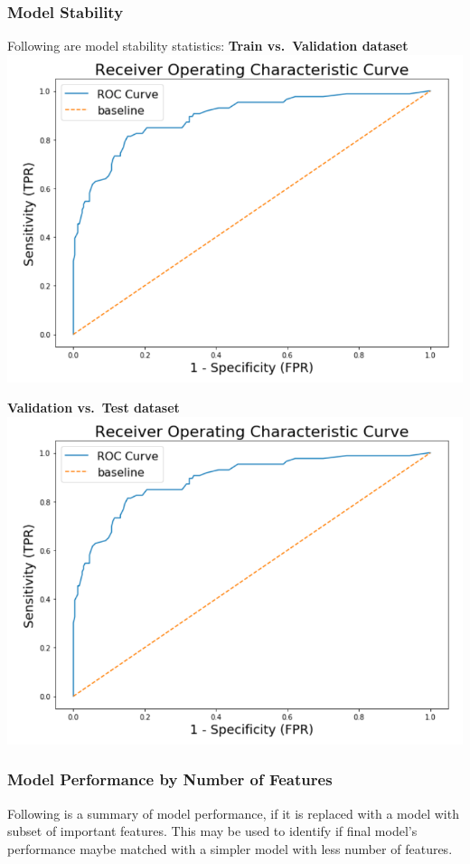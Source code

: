 \documentclass[
  letterpaper,
  DIV=11,
  numbers=noendperiod]{scrartcl}
\begin{document}
\hypertarget{model-stability-1}{%
\subsubsection{Model Stability}\label{model-stability-1}}

Following are model stability statistics: \textbf{Train vs.~Validation
dataset} \includegraphics{Images/roc.png}

\textbf{Validation vs.~Test dataset} \includegraphics{Images/roc.png}

\hypertarget{model-performance-by-number-of-features}{%
\subsubsection{Model Performance by Number of
Features}\label{model-performance-by-number-of-features}}

Following is a summary of model performance, if it is replaced with a
model with subset of important features. This may be used to identify if
final model's performance maybe matched with a simpler model with less
number of features.
\end{document}
